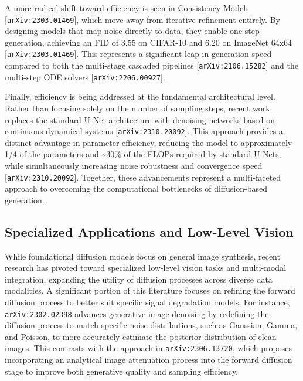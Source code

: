\documentclass[11pt]{article}
\begin{document}
A more radical shift toward efficiency is seen in Consistency Models [\texttt{arXiv:2303.01469}], which move away from iterative refinement entirely. By designing models that map noise directly to data, they enable one-step generation, achieving an FID of 3.55 on CIFAR-10 and 6.20 on ImageNet 64x64 [\texttt{arXiv:2303.01469}]. This represents a significant leap in generation speed compared to both the multi-stage cascaded pipelines [\texttt{arXiv:2106.15282}] and the multi-step ODE solvers [\texttt{arXiv:2206.00927}].

Finally, efficiency is being addressed at the fundamental architectural level. Rather than focusing solely on the number of sampling steps, recent work replaces the standard U-Net architecture with denoising networks based on continuous dynamical systems [\texttt{arXiv:2310.20092}]. This approach provides a distinct advantage in parameter efficiency, reducing the model to approximately 1/4 of the parameters and \textasciitilde{}30\% of the FLOPs required by standard U-Nets, while simultaneously increasing noise robustness and convergence speed [\texttt{arXiv:2310.20092}]. Together, these advancements represent a multi-faceted approach to overcoming the computational bottlenecks of diffusion-based generation.

\subsection{Specialized Applications and Low-Level Vision}

While foundational diffusion models focus on general image synthesis, recent research has pivoted toward specialized low-level vision tasks and multi-modal integration, expanding the utility of diffusion processes across diverse data modalities. A significant portion of this literature focuses on refining the forward diffusion process to better suit specific signal degradation models. For instance, \texttt{arXiv:2302.02398} advances generative image denoising by redefining the diffusion process to match specific noise distributions, such as Gaussian, Gamma, and Poisson, to more accurately estimate the posterior distribution of clean images. This contrasts with the approach in \texttt{arXiv:2306.13720}, which proposes incorporating an analytical image attenuation process into the forward diffusion stage to improve both generative quality and sampling efficiency.
\end{document}
